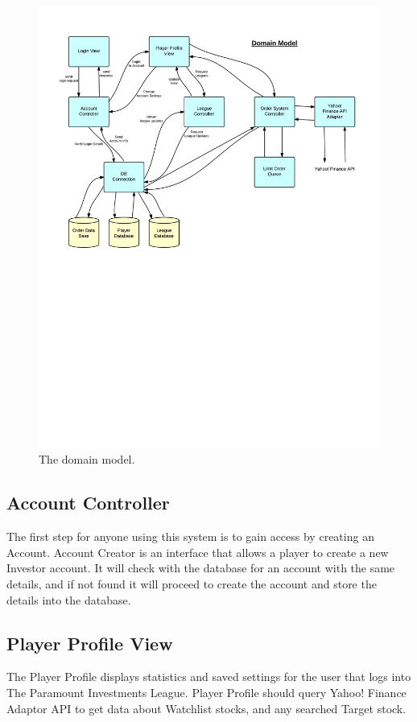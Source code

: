 \begin{figure}[H]
\centering
\includegraphics[width=5.5in]{./img/domModel.jpg}
\caption{The domain model.}
\end{figure}

\subsection{Account Controller}
The first step for anyone using this system is to gain access by creating an Account.
Account Creator is an interface that allows a player to create a new Investor account.
It will check with the database for an account with the same details, and if not found
it will proceed to create the account and store the details into the database.\\

\subsection{Player Profile View}
The Player Profile displays statistics and saved settings for the user that logs
into The Paramount Investments League. Player Profile should query Yahoo! Finance
Adaptor API to get data about Watchlist stocks, and any searched Target stock.\\

